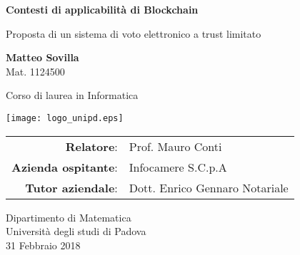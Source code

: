 \begin{titlepage}
    \begin{center}
        \vspace*{1cm}
        
        \Huge
        \textbf{Contesti di applicabilità di Blockchain}
        
        \vspace{0.5cm}
        \large
        Proposta di un sistema di voto elettronico a trust limitato
        
        \vspace{1.5cm}
        
        \textbf{Matteo Sovilla} \\ Mat. 1124500
        
        \vspace{1cm}
        
        Corso di laurea in Informatica
        
        \vspace{0.8cm}
        
        \texttt{[image: logo\_unipd.eps]}

        \vspace{0.5cm}
        
        \vspace{0.5cm}
        
        \begin{center}
        	\begin{tabular}{ r l }
        		\textbf{Relatore}: & Prof. Mauro Conti \\
        		\textbf{Azienda ospitante}: & Infocamere S.C.p.A \\
        		\textbf{Tutor aziendale}: & Dott. Enrico Gennaro Notariale \\
        	\end{tabular}
        \end{center}
        
        \vspace{0.5cm}
        
        \large
        Dipartimento di Matematica\\
        Università degli studi di Padova\\
        31 Febbraio 2018
        
    \end{center}
\end{titlepage}